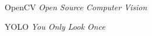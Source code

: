 \begin{siglas}
	\item[OpenCV] \textit{Open Source Computer Vision}
	\item[YOLO] \textit{You Only Look Once}
\end{siglas}

